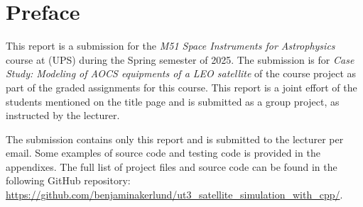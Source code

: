 \section*{Preface}

This report is a submission for the \textit{M51 Space Instruments for Astrophysics} course at (UPS) during the Spring semester of 2025.
The submission is for \textit{Case Study: Modeling of AOCS
equipments of a LEO satellite} of the course project as part of the graded assignments for this course.
This report is a joint effort of the students mentioned on the title page and is submitted as a group project, as instructed by the lecturer.

The submission contains only this report and is submitted to the lecturer per email. 
Some examples of source code and testing code is provided in the appendixes.
The full list of project files and source code can be found in the following GitHub repository: \url{https://github.com/benjaminakerlund/ut3_satellite_simulation_with_cpp/}.




